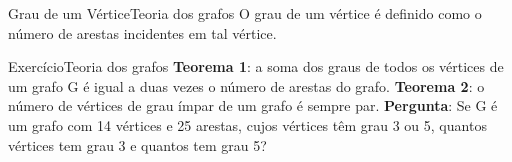 \documentclass[t]{beamer}
\begin{document}

\begin{ftst}{Grau de um Vértice}{Teoria dos grafos}
\justifying
O grau de um vértice é definido como o número de arestas incidentes em tal vértice.
\vone
\vone
\centering
\\


\end{ftst}


\begin{ftst}{Exercício}{Teoria dos grafos}
\justifying
\textbf{Teorema 1}: a soma dos graus de todos os vértices de um grafo G é igual a duas vezes o número de arestas do grafo.
\vone
\textbf{Teorema 2}: o número de vértices de grau ímpar de um grafo é sempre par.
\vone
\textbf{Pergunta}: Se G é um grafo com 14 vértices e 25 arestas, cujos vértices têm grau 3 ou 5, quantos vértices tem grau 3 e quantos tem grau 5?



\end{ftst}

\end{document}
